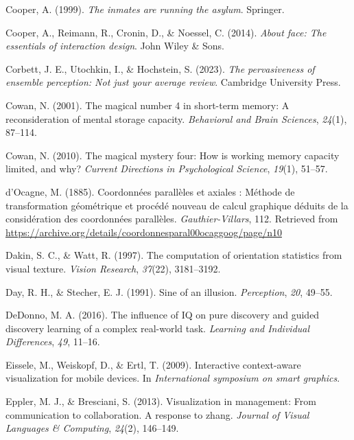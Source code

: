 \documentclass[print]{nuthesis}
\newlength{\cslhangindent}
\newenvironment{CSLReferences}[2]%
{\setlength{\parindent}{0pt}%
\everypar{\setlength{\hangindent}{\cslhangindent}}\ignorespaces}%
{\par}
\begin{document}
\begin{CSLReferences}{1}{0}
\leavevmode{}%
Cooper, A. (1999). \emph{The inmates are running the asylum}. Springer.

\leavevmode{}%
Cooper, A., Reimann, R., Cronin, D., \& Noessel, C. (2014). \emph{About face: The essentials of interaction design}. John Wiley \& Sons.

\leavevmode{}%
Corbett, J. E., Utochkin, I., \& Hochstein, S. (2023). \emph{The pervasiveness of ensemble perception: Not just your average review}. Cambridge University Press.

\leavevmode{}%
Cowan, N. (2001). The magical number 4 in short-term memory: A reconsideration of mental storage capacity. \emph{Behavioral and Brain Sciences}, \emph{24}(1), 87--114.

\leavevmode{}%
Cowan, N. (2010). The magical mystery four: How is working memory capacity limited, and why? \emph{Current Directions in Psychological Science}, \emph{19}(1), 51--57.

\leavevmode{}%
d'Ocagne, M. (1885). {Coordonnées parallèles et axiales : Méthode de transformation géométrique et procédé nouveau de calcul graphique déduits de la considération des coordonnées parallèles}. \emph{Gauthier-Villars}, 112. Retrieved from \url{https://archive.org/details/coordonnesparal00ocaggoog/page/n10}

\leavevmode{}%
Dakin, S. C., \& Watt, R. (1997). The computation of orientation statistics from visual texture. \emph{Vision Research}, \emph{37}(22), 3181--3192.

\leavevmode{}%
Day, R. H., \& Stecher, E. J. (1991). Sine of an illusion. \emph{Perception}, \emph{20}, 49--55.

\leavevmode{}%
DeDonno, M. A. (2016). The influence of IQ on pure discovery and guided discovery learning of a complex real-world task. \emph{Learning and Individual Differences}, \emph{49}, 11--16.

\leavevmode{}%
Eissele, M., Weiskopf, D., \& Ertl, T. (2009). Interactive context-aware visualization for mobile devices. In \emph{International symposium on smart graphics}.

\leavevmode{}%
Eppler, M. J., \& Bresciani, S. (2013). Visualization in management: From communication to collaboration. A response to zhang. \emph{Journal of Visual Languages \& Computing}, \emph{24}(2), 146--149.


\end{CSLReferences}
\end{document}
